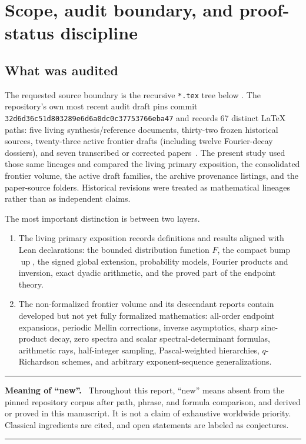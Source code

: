 \documentclass[11pt,oneside]{article}
\theoremstyle{definition}
\newcommand{\Up}{\operatorname{up}}
\newenvironment{statusbox}[1]{%
  \par\medskip\begin{center}\begin{minipage}{0.94\textwidth}%
  \hrule\medskip\textbf{#1.}\ }%
  {\par\medskip\hrule\end{minipage}\end{center}\medskip}
\begin{document}
\clearpage

\section{Scope, audit boundary, and proof-status discipline}
\label{p1:sec:audit}

\subsection{What was audited}

The requested source boundary is the recursive \texttt{*.tex} tree below
.  The repository's own most recent audit draft
pins commit \texttt{32d6d36c51d803289e6d6a0dc0c37753766eba47} and records 67
distinct LaTeX paths: five living synthesis/reference documents, thirty-two frozen
historical sources, twenty-three active frontier drafts (including twelve Fourier-decay
dossiers), and seven transcribed or corrected papers~\cite{p1:ReshetnikovRepo}.  The present study used those same lineages and compared the living primary exposition, the consolidated frontier
volume, the active draft families, the archive provenance listings, and the paper-source
folders.  Historical revisions were treated as mathematical lineages rather than as
independent claims.

The most important distinction is between two layers.
\begin{enumerate}[label=(\roman*),leftmargin=2.2em]
\item The living primary exposition records definitions and results aligned with Lean
      declarations: the bounded distribution function \(F\), the compact bump \(\Up\),
      the signed global extension, probability models, Fourier products and inversion,
      exact dyadic arithmetic, and the proved part of the endpoint theory.
\item The non-formalized frontier volume and its descendant reports contain developed
      but not yet fully formalized mathematics: all-order endpoint expansions,
      periodic Mellin corrections, inverse asymptotics, sharp sinc-product decay,
      zero spectra and scalar spectral-determinant formulas, arithmetic rays,
      half-integer sampling, Pascal-weighted hierarchies, \(q\)-Richardson schemes,
      and arbitrary exponent-sequence generalizations.
\end{enumerate}

\begin{statusbox}{Meaning of ``new''}
Throughout this report, ``new'' means absent from the pinned repository corpus after
path, phrase, and formula comparison, and derived or proved in this manuscript.  It is
not a claim of exhaustive worldwide priority.  Classical ingredients are cited, and
open statements are labeled as conjectures.
\end{statusbox}
\end{document}
